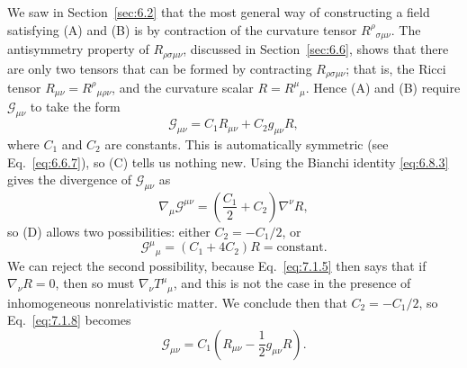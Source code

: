 We saw in Section~\ref{sec:6.2} that the most general way of constructing a
field satisfying (A) and (B) is by contraction of the curvature tensor
\(R^\rho{}_{\sigma\mu\nu}\). The antisymmetry property of
\(R_{\rho\sigma\mu\nu}\), discussed in Section~\ref{sec:6.6}, shows that
there are only two tensors that can be formed by contracting
\(R_{\rho\sigma\mu\nu}\); that is, the Ricci tensor
\(R_{\mu\nu}=R^\rho{}_{\mu\rho\nu}\), and the curvature scalar
\(R=R^\mu{}_\mu\). Hence (A) and (B) require
\(\mathcal G_{\mu\nu}\) to take the form
\begin{equation}
  \mathcal G_{\mu\nu}
  =C_1R_{\mu\nu}+C_2g_{\mu\nu}R,
  \tag{7.1.8}\label{eq:7.1.8}
\end{equation}
where \(C_1\) and \(C_2\) are constants. This is automatically symmetric
(see Eq.~\eqref{eq:6.6.7}), so (C) tells us nothing new. Using the Bianchi
identity \eqref{eq:6.8.3} gives the divergence of
\(\mathcal G_{\mu\nu}\) as
\[
  \nabla_\mu\mathcal G^{\mu\nu}
  =
  \left(\frac{C_1}{2}+C_2\right)\nabla^\nu R,
\]
so (D) allows two possibilities: either \(C_2=-C_1/2\), or
\[
  \mathcal G^\mu{}_\mu=(C_1+4C_2)R=\text{constant}.
\]
We can reject the second possibility, because Eq.~\eqref{eq:7.1.5} then says
that if \(\nabla_\nu R=0\), then so must
\(\nabla_\nu T^\mu{}_\mu\), and this is not the case in the presence of
inhomogeneous nonrelativistic matter. We conclude then that
\(C_2=-C_1/2\), so Eq.~\eqref{eq:7.1.8} becomes
\begin{equation}
  \mathcal G_{\mu\nu}
  =
  C_1\left(R_{\mu\nu}-\frac12g_{\mu\nu}R\right).
  \tag{7.1.9}\label{eq:7.1.9}
\end{equation}

